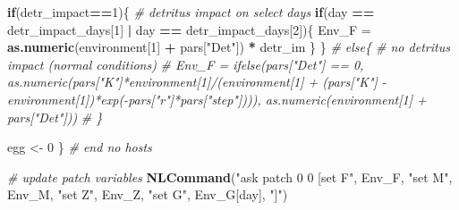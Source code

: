 \documentclass[10,portrait]{article}
\newenvironment{Shaded}{\begin{snugshade}}{\end{snugshade}}
\newcommand{\KeywordTok}[1]{\textcolor[rgb]{0.13,0.29,0.53}{\textbf{#1}}}
\newcommand{\DecValTok}[1]{\textcolor[rgb]{0.00,0.00,0.81}{#1}}
\newcommand{\StringTok}[1]{\textcolor[rgb]{0.31,0.60,0.02}{#1}}
\newcommand{\CommentTok}[1]{\textcolor[rgb]{0.56,0.35,0.01}{\textit{#1}}}
\newcommand{\ControlFlowTok}[1]{\textcolor[rgb]{0.13,0.29,0.53}{\textbf{#1}}}
\newcommand{\OperatorTok}[1]{\textcolor[rgb]{0.81,0.36,0.00}{\textbf{#1}}}
\newcommand{\NormalTok}[1]{#1}
\begin{document}
\begin{Shaded}
\begin{Highlighting}[]
{{{{{{{{{{{                        \ControlFlowTok{if}\NormalTok{(detr_impact}\OperatorTok{==}\DecValTok{1}\NormalTok{)\{ }\CommentTok{# detritus impact on select days }
                          \ControlFlowTok{if}\NormalTok{(day }\OperatorTok{==}\StringTok{ }\NormalTok{detr_impact_days[}\DecValTok{1}\NormalTok{] }\OperatorTok{|}\StringTok{ }\NormalTok{day }\OperatorTok{==}\StringTok{ }\NormalTok{detr_impact_days[}\DecValTok{2}\NormalTok{])\{}
\NormalTok{                            Env_F =}\StringTok{ }\KeywordTok{as.numeric}\NormalTok{(environment[}\DecValTok{1}\NormalTok{] }\OperatorTok{+}\StringTok{ }\NormalTok{pars[}\StringTok{"Det"}\NormalTok{]) }\OperatorTok{*}\StringTok{ }\NormalTok{detr_im}
\NormalTok{                          \}}
\NormalTok{                        \}}
                        \CommentTok{# else\{ # no detritus impact (normal conditions)}
                        \CommentTok{#     Env_F = ifelse(pars["Det"] == 0, as.numeric(pars["K"]*environment[1]/(environment[1] + (pars["K"] - environment[1])*exp(-pars["r"]*pars["step"]))), as.numeric(environment[1] + pars["Det"]))}
                        \CommentTok{#   \}}
                        
\NormalTok{                        egg <-}\StringTok{ }\DecValTok{0}
\NormalTok{                      \} }\CommentTok{# end no hosts}
                      
                      \CommentTok{# update patch variables }
                      \KeywordTok{NLCommand}\NormalTok{(}\StringTok{"ask patch 0 0 [set F"}\NormalTok{, Env_F, }\StringTok{"set M"}\NormalTok{, Env_M, }\StringTok{"set Z"}\NormalTok{, Env_Z, }\StringTok{"set G"}\NormalTok{, Env_G[day], }\StringTok{"]"}\NormalTok{)}
                      
}}}}}}}}}}}
\end{Highlighting}
\end{Shaded}
\end{document}

